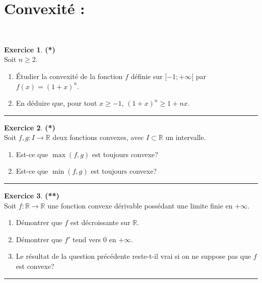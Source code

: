 \documentclass[a4paper,11pt]{article}
\theoremstyle{definition}
\newtheorem{exo}{Exercice} %
\begin{document}
\section*{Convexité :}\hfill\\%
\begin{minipage}{1\linewidth}
	\begin{minipage}[t]{0.48\linewidth}
		\raggedright
		
		
		\begin{exo}\textbf{(*)}\quad\\[0.2cm]
			Soit $n\geq 2$. 
			\begin{enumerate}
				\item \'Etudier la convexité de la fonction $f$ définie sur $[-1;+\infty[$ par $f(x)=(1+x)^n$. 
				\item En déduire que, pour tout $x\geq -1$, $(1+x)^n\geq 1+nx$.
			\end{enumerate}
			
			\centering
			\rule{1\linewidth}{0.6pt}
		\end{exo}
		
		
		\begin{exo}\textbf{(*)}\quad\\[0.2cm]
			Soit $f,g:I\to\mathbb R$ deux fonctions convexes, avec $I\subset \mathbb R$ un intervalle.
			\begin{enumerate}
				\item Est-ce que $\max(f,g)$ est toujours convexe?
				\item Est-ce que $\min(f,g)$ est toujours convexe?
			\end{enumerate}
			
			
			\centering
			\rule{1\linewidth}{0.6pt}
		\end{exo}
		
		\begin{exo}\textbf{(**)}\quad\\[0.2cm]
			Soit $f:\mathbb R\to\mathbb R$ une fonction convexe dérivable possédant une limite finie en $+\infty$.
			\begin{enumerate}
				\item Démontrer que $f$ est décroissante sur $\mathbb R$.
				\item Démontrer que $f'$ tend vers $0$ en $+\infty$.
				\item Le résultat de la question précédente reste-t-il vrai si on ne suppose pas que $f$ est convexe?
			\end{enumerate}
			
			
			\centering
			\rule{1\linewidth}{0.6pt}
		\end{exo}
	

\end{minipage}
\end{minipage}
\end{document}

